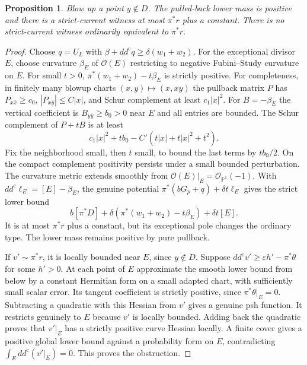 \documentclass[11pt]{article}
\newtheorem{proposition}[theorem]{Proposition}
\theoremstyle{remark}
\newcommand{\ddc}{dd^{\mathrm c}}
\newcommand{\PP}{\mathbb P}
\begin{document}
\begin{proposition}\label{prop:blowup}
Blow up a point $y\notin D$. The pulled-back lower mass is positive and
there is a strict-current witness at most $\pi^*r$ plus a constant.
There is no strict-current witness ordinarily equivalent to $\pi^*r$.
\end{proposition}
\begin{proof}
Choose $q=U_L$ with $\beta+\ddc q\geq\delta(w_1+w_2)$.
For the exceptional divisor $E$, choose curvature $\beta_E$ of
$\mathcal O(E)$ restricting to negative Fubini--Study curvature on $E$.
For small $t>0$, $\pi^*(w_1+w_2)-t\beta_E$ is strictly positive.
For completeness, in finitely many blowup charts
$(x,y)\mapsto(x,xy)$ the pullback matrix $P$ has
$P_{x\bar x}\geq c_0$, $|P_{x\bar y}|\leq C|x|$, and Schur complement
at least $c_1|x|^2$. For $B=-\beta_E$ the vertical coefficient is
$B_{y\bar y}\geq b_0>0$ near $E$ and all entries are bounded.
The Schur complement of $P+tB$ is at least
\[
 c_1|x|^2+tb_0-C'(t|x|+t|x|^2+t^2).
\]
Fix the neighborhood small, then $t$ small, to bound the last terms by
$tb_0/2$. On the compact complement positivity persists under a small
bounded perturbation. The curvature metric extends smoothly from
$\mathcal O(E)|_E=\mathcal O_{\PP^1}(-1)$.
With $\ddc\ell_E=[E]-\beta_E$, the genuine potential
$\pi^*(bG_p+q)+\delta t\ell_E$ gives the strict lower bound
\[
 b[\pi^*D]+\delta(\pi^*(w_1+w_2)-t\beta_E)+\delta t[E].
\]
It is at most $\pi^*r$ plus a constant, but its exceptional pole changes
the ordinary type. The lower mass remains positive by pure pullback.

If $v'\sim\pi^*r$, it is locally bounded near $E$, since $y\notin D$.
Suppose $\ddc v'\geq\varepsilon h'-\pi^*\theta$ for some $h'>0$.
At each point of $E$ approximate the smooth lower bound from below by
a constant Hermitian form on a small adapted chart, with sufficiently
small scalar error. Its tangent coefficient is strictly positive, since
$\pi^*\theta|_E=0$. Subtracting a quadratic with this Hessian from $v'$
gives a genuine psh function. It restricts genuinely to $E$ because $v'$
is locally bounded. Adding back the quadratic proves that $v'|_E$ has
a strictly positive curve Hessian locally. A finite cover gives a positive
global lower bound against a probability form on $E$, contradicting
$\int_E\ddc(v'|_E)=0$. This proves the obstruction.
\end{proof}
\end{document}
